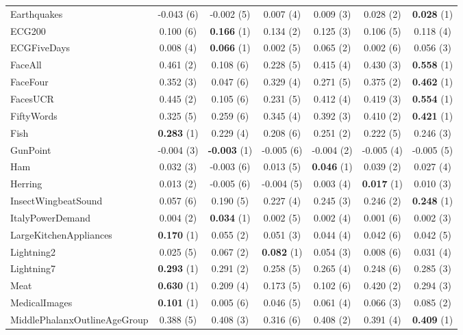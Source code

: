 \begin{table}[ht]
\begin{adjustbox}{width=\textwidth}
\begin{tabular}{lcccccc}
    Earthquakes & -0.043 (6) & -0.002 (5) & 0.007 (4) & 0.009 (3) & 0.028 (2) & \textbf{0.028} (1) \\
    ECG200 & 0.100 (6) & \textbf{0.166} (1) & 0.134 (2) & 0.125 (3) & 0.106 (5) & 0.118 (4) \\
    ECGFiveDays & 0.008 (4) & \textbf{0.066} (1) & 0.002 (5) & 0.065 (2) & 0.002 (6) & 0.056 (3) \\
    FaceAll & 0.461 (2) & 0.108 (6) & 0.228 (5) & 0.415 (4) & 0.430 (3) & \textbf{0.558} (1) \\
    FaceFour & 0.352 (3) & 0.047 (6) & 0.329 (4) & 0.271 (5) & 0.375 (2) & \textbf{0.462} (1) \\
    FacesUCR & 0.445 (2) & 0.105 (6) & 0.231 (5) & 0.412 (4) & 0.419 (3) & \textbf{0.554} (1) \\
    FiftyWords & 0.325 (5) & 0.259 (6) & 0.345 (4) & 0.392 (3) & 0.410 (2) & \textbf{0.421} (1) \\
    Fish & \textbf{0.283} (1) & 0.229 (4) & 0.208 (6) & 0.251 (2) & 0.222 (5) & 0.246 (3) \\
    GunPoint & -0.004 (3) & \textbf{-0.003} (1) & -0.005 (6) & -0.004 (2) & -0.005 (4) & -0.005 (5) \\
    Ham & 0.032 (3) & -0.003 (6) & 0.013 (5) & \textbf{0.046} (1) & 0.039 (2) & 0.027 (4) \\
    Herring & 0.013 (2) & -0.005 (6) & -0.004 (5) & 0.003 (4) & \textbf{0.017} (1) & 0.010 (3) \\
    InsectWingbeatSound & 0.057 (6) & 0.190 (5) & 0.227 (4) & 0.245 (3) & 0.246 (2) & \textbf{0.248} (1) \\
    ItalyPowerDemand & 0.004 (2) & \textbf{0.034} (1) & 0.002 (5) & 0.002 (4) & 0.001 (6) & 0.002 (3) \\
    LargeKitchenAppliances & \textbf{0.170} (1) & 0.055 (2) & 0.051 (3) & 0.044 (4) & 0.042 (6) & 0.042 (5) \\
    Lightning2 & 0.025 (5) & 0.067 (2) & \textbf{0.082} (1) & 0.054 (3) & 0.008 (6) & 0.031 (4) \\
    Lightning7 & \textbf{0.293} (1) & 0.291 (2) & 0.258 (5) & 0.265 (4) & 0.248 (6) & 0.285 (3) \\
    Meat & \textbf{0.630} (1) & 0.209 (4) & 0.173 (5) & 0.102 (6) & 0.420 (2) & 0.294 (3) \\
    MedicalImages & \textbf{0.101} (1) & 0.005 (6) & 0.046 (5) & 0.061 (4) & 0.066 (3) & 0.085 (2) \\
    MiddlePhalanxOutlineAgeGroup & 0.388 (5) & 0.408 (3) & 0.316 (6) & 0.408 (2) & 0.391 (4) & \textbf{0.409} (1) \\

\end{tabular}
\end{adjustbox}
\end{table}
